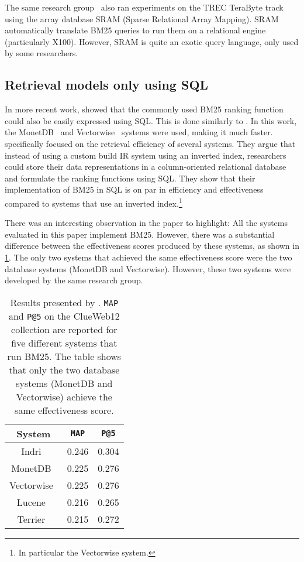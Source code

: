 The same research group~\citep{array-db} also ran experiments on the TREC TeraByte track using the array database SRAM (Sparse Relational Array Mapping). SRAM automatically translate BM25 queries to run them on a relational engine (particularly X100). However, SRAM is quite an exotic query language, only used by some researchers. 

\subsection{Retrieval models only using SQL}
In more recent work, \citet{OldDog} showed that the commonly used BM25 ranking function could also be easily expressed using SQL. This is done similarly to \citet{PowerDB-IR}. In this work, the MonetDB~\citep{monet} and Vectorwise~\citep{vectorwise} systems were used, making it much faster.  specifically focused on the retrieval efficiency of several systems. They argue that instead of using a custom build IR system using an inverted index, researchers could store their data representations in a column-oriented relational database and formulate the ranking functions using SQL. They show that their implementation of BM25 in SQL is on par in efficiency and effectiveness compared to systems that use an inverted index.\footnote{In particular the Vectorwise system.}  

There was an interesting observation in the paper to highlight: All the systems evaluated in this paper implement BM25. However, there was a substantial difference between the effectiveness scores produced by these systems, as shown in \cref{olddog_results}. The only two systems that achieved the same effectiveness score were the two database systems (MonetDB and Vectorwise). However, these two systems were developed by the same research group.

\begin{table}[!ht]
	\centering
	\caption{Results presented by \citet{OldDog}. \texttt{MAP} and \texttt{P@5} on the ClueWeb12 collection are reported for five different systems that run BM25. The table shows that only the two database systems (MonetDB and Vectorwise) achieve the same effectiveness score.}
	\label{olddog_results}
	\begin{tabular}{c c c}
		\toprule
		System &  \texttt{MAP} & \texttt{P@5} \\
		\midrule
		Indri~\citep{indri} & 0.246 & 0.304 \\
		MonetDB~\citep{monet} & 0.225 & 0.276 \\
		Vectorwise~\citep{vectorwise} & 0.225 & 0.276 \\
		Lucene~\citep{lucene} & 0.216 & 0.265 \\
		Terrier~\citep{terrier} & 0.215 & 0.272 \\
		\bottomrule
	\end{tabular}
\end{table}

